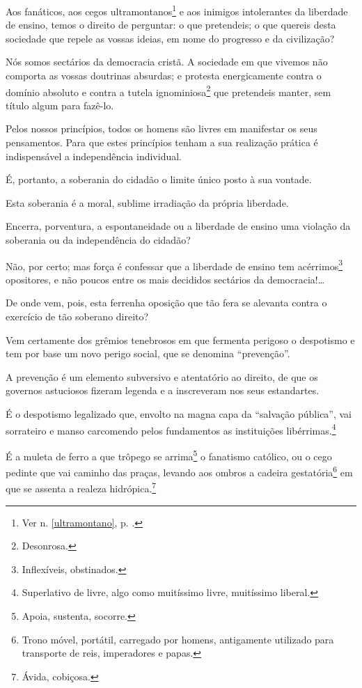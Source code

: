 Aos fanáticos, aos cegos ultramontanos\footnote{Ver n. \ref{ultramontano}, 
p. \pageref{ultramontano}.} e aos inimigos intolerantes da liberdade de ensino,
temos o direito de perguntar: o que pretendeis; o que quereis desta
sociedade que repele as vossas ideias, em nome do progresso e da
civilização?

Nós somos sectários da democracia cristã. A sociedade em que vivemos não
comporta as vossas doutrinas absurdas; e protesta energicamente contra o
domínio absoluto e contra a tutela ignominiosa\footnote{Desonrosa.}
que pretendeis manter, sem título algum para fazê-lo.

Pelos nossos princípios, todos os homens são livres em manifestar os
seus pensamentos. Para que estes princípios tenham a sua realização
prática é indispensável a independência individual.

É, portanto, a soberania do cidadão o limite único posto à sua vontade.

Esta soberania é a moral, sublime irradiação da própria liberdade.

Encerra, porventura, a espontaneidade ou a liberdade de ensino uma
violação da soberania ou da independência do cidadão?

Não, por certo; mas força é confessar que a liberdade de ensino tem
acérrimos\footnote{Inflexíveis, obstinados.} opositores, e não poucos
entre os mais decididos sectários da democracia!\ldots{}

De onde vem, pois, esta ferrenha oposição que tão fera se alevanta
contra o exercício de tão soberano direito?

Vem certamente dos grêmios tenebrosos em que fermenta perigoso o
despotismo e tem por base um novo perigo social, que se denomina
``prevenção''.

A prevenção é um elemento subversivo e atentatório ao direito, de que os
governos astuciosos fizeram legenda e a inscreveram nos seus
estandartes.

É o despotismo legalizado que, envolto na magna capa da ``salvação
pública'', vai sorrateiro e manso carcomendo pelos fundamentos as
instituições libérrimas.\footnote{Superlativo de livre, algo como
  muitíssimo livre, muitíssimo liberal.}

É a muleta de ferro a que trôpego se arrima\footnote{Apoia, sustenta,
  socorre.} o fanatismo católico, ou o cego pedinte que vai caminho das %
praças, levando aos ombros a cadeira gestatória\footnote{Trono móvel,
  portátil, carregado por homens, antigamente utilizado para transporte
  de reis, imperadores e papas.} em que se assenta a realeza
hidrópica.\footnote{Ávida, cobiçosa.}

